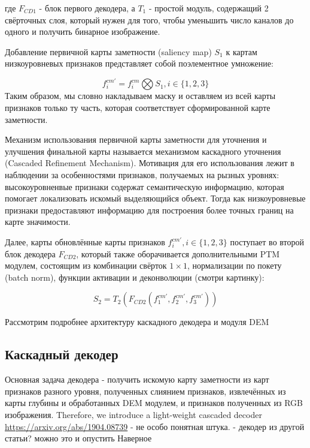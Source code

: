 где $F_{CD1}$ - блок первого декодера, а $T_1$ - простой модуль, содержащий 2 свёрточных слоя, который
нужен для того, чтобы уменьшить число каналов до одного и получить бинарное изображение.

Добавление первичной карты заметности (saliency map) $S_1$ к картам низкоуровневых признаков представляет собой
 поэлементное умножение:

\begin{equation}
    f_i^{cm'} = f_i^{cm} \bigotimes S_1, i \in \{1,2,3\}
\end{equation}
Таким образом, мы словно накладываем маску и оставляем из всей карты признаков только ту часть, которая соответствует 
сформированной карте заметности.

Механизм использования первичной карты заметности для уточнения и улучшения финальной карты называется механизмом каскадного уточнения (Cascaded Refinement Mechanism).
Мотивация для его использования лежит в наблюдении за особенностями признаков, получаемых на рызных уровнях: высокоуровненвые признаки содержат семантическую информацию,
которая помогает локализовать искомый выделяющийся объект. Тогда как низкоуровневые признаки предоставляют информацию для построения более точных границ на карте значимости.

Далее, карты обновлённые карты признаков $f_i^{cm'}, i \in \{1,2,3\} $ поступает во второй блок декодера $F_{CD2}$, который также оборачивается дополнительными PTM модулем,
состоящим из комбинации свёрток $1 \times 1$, нормализации по покету (batch norm), функции активации и деконволюции (смотри картинку):

\begin{equation}
    S_2 = T_2(F_{CD2}(f_1^{cm'},f_2^{cm'},f_3^{cm'}))
\end{equation}


Рассмотрим подробнее архитектуру каскадного декодера и модуля DEM

\subsection{Каскадный декодер}
Основная задача декодера - получить искомую карту заметности из карт признаков разного уровня, полученных слиянием признаков, извлечённых из карты глубины и обработанных DEM модулем, и признаков
полученных из RGB изображения.
Therefore, we introduce a light-weight cascaded decoder \url{https://arxiv.org/abs/1904.08739}  - не особо понятная штука. - декодер из другой статьи? можно это и опустить Наверное

